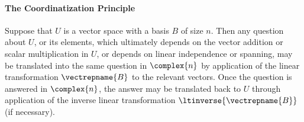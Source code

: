 \paragraph{The Coordinatization Principle}
\label{principle}
\hypertarget{principle}{Suppose} that $U$ is a vector space with a basis $B$ of size $n$.   Then any question about $U$, or its elements, which ultimately depends on the vector addition or scalar multiplication in $U$, or depends on linear independence or spanning, may be translated into the same question in $\complex{n}$ by application of the linear transformation $\vectrepname{B}$ to the relevant vectors.  Once the question is answered in $\complex{n}$, the answer may be translated back to $U$ through application of the inverse linear transformation $\ltinverse{\vectrepname{B}}$ (if necessary).\par\medskip
%

